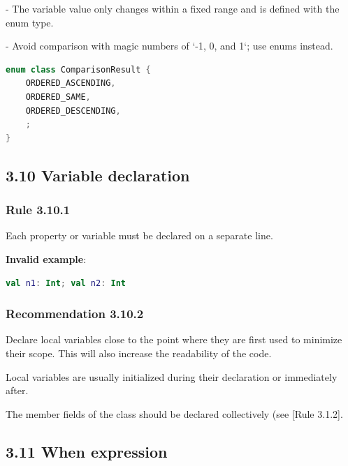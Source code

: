 {{{{- The variable value only changes within a fixed range and is defined with the enum type.

- Avoid comparison with magic numbers of `-1, 0, and 1`; use enums instead.



\begin{lstlisting}[language=Kotlin]
enum class ComparisonResult {
    ORDERED_ASCENDING,
    ORDERED_SAME,
    ORDERED_DESCENDING,
    ;
}
\end{lstlisting}


\subsection*{\textbf{3.10 Variable declaration}}

\subsubsection*{\textbf{Rule 3.10.1}}
\leavevmode\newline



Each property or variable must be declared on a separate line.



\textbf{Invalid example}:

\begin{lstlisting}[language=Kotlin]
val n1: Int; val n2: Int
\end{lstlisting}


\subsubsection*{\textbf{Recommendation 3.10.2}}
\leavevmode\newline

Declare local variables close to the point where they are first used to minimize their scope. This will also increase the readability of the code.

Local variables are usually initialized during their declaration or immediately after.

The member fields of the class should be declared collectively (see [Rule 3.1.2].



\subsection*{\textbf{3.11 When expression}}

}}}}
